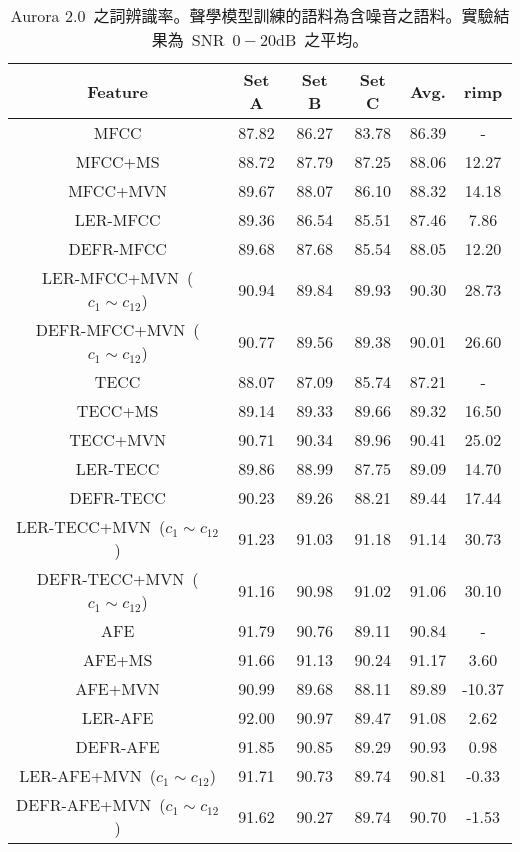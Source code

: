 \begin{table}[!htb]
\renewcommand{\arraystretch}{1.1}
\centering
\caption{Aurora 2.0~之詞辨識率。聲學模型訓練的語料為含噪音之語料。實驗結果為~SNR~$0-20$dB~之平均。}
\label{table:aurora2_multi}  
\vspace{2mm}
\begin{tabular}{c|ccc|c|c}
\hline 
Feature & Set A & Set B & Set C & Avg. & rimp  \\ 
\hline \hline
{MFCC}  & 87.82 & 86.27 & 83.78 & 86.39 &  -\\
{MFCC+MS} & 88.72 & 87.79 & 87.25 & 88.06 & 12.27\\
{MFCC+MVN} & 89.67 & 88.07 & 86.10 & 88.32 & 14.18\\
{LER-MFCC} & 89.36 & 86.54 & 85.51 & 87.46 & 7.86\\
{DEFR-MFCC} & 89.68 & 87.68 & 85.54 & 88.05 & 12.20\\
{LER-MFCC+MVN~($c_1 \sim c_{12}$)} & 90.94 & 89.84 & 89.93 & 90.30  & 28.73\\
{DEFR-MFCC+MVN~($c_1 \sim c_{12}$)} &  90.77 & 89.56 & 89.38 & 90.01 & 26.60\\
\hline
{TECC}  & 88.07 & 87.09 & 85.74 & 87.21 & - \\
{TECC+MS} & 89.14 & 89.33 & 89.66 & 89.32 & 16.50\\
{TECC+MVN} & 90.71 & 90.34 & 89.96 & 90.41 & 25.02\\
{LER-TECC} & 89.86 & 88.99 & 87.75 & 89.09 & 14.70\\
{DEFR-TECC}  & 90.23 & 89.26 & 88.21 & 89.44 & 17.44\\
{LER-TECC+MVN~($c_1 \sim c_{12}$)} & 91.23 & 91.03 & 91.18 & 91.14 & 30.73\\
{DEFR-TECC+MVN~($c_1 \sim c_{12}$)} & 91.16 & 90.98 & 91.02 & 91.06  & 30.10\\
\hline
{AFE} & 91.79 & 90.76  & 89.11 & 90.84 & - \\
{AFE+MS} & 91.66 & 91.13 & 90.24  & 91.17  & 3.60 \\
{AFE+MVN} & 90.99 & 89.68 & 88.11 & 89.89 & -10.37 \\
{LER-AFE}& 92.00 & 90.97 & 89.47  & 91.08  & 2.62 \\
{DEFR-AFE} &91.85  & 90.85 & 89.29  & 90.93  & 0.98 \\
{LER-AFE+MVN~($c_1 \sim c_{12}$)} & 91.71 & 90.73 & 89.74 & 90.81 & -0.33\\
{DEFR-AFE+MVN~($c_1 \sim c_{12}$)} & 91.62 & 90.27 & 89.74 & 90.70 & -1.53\\
\hline
\end{tabular}
\end{table}


